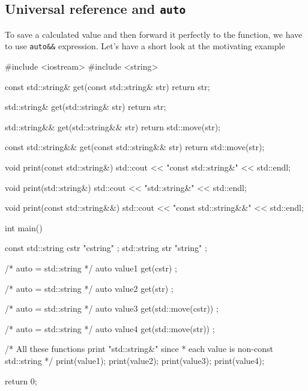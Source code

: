\documentclass[../main]{subfiles}
\begin{document}
\subsection{Universal reference and \texttt{auto}}
    To save a calculated value and then forward it perfectly to the function, we have to use \texttt{auto\&\&} expression. Let's have a short look at the motivating example
\begin{Code}
    #include <iostream>
    #include <string>
    
    const std::string& get(const std::string& str)
    {
        return str;
    }
    
    std::string& get(std::string& str)
    {
        return str;
    }
    
    std::string&& get(std::string&& str)
    {
        return std::move(str);
    }
    
    const std::string&& get(const std::string&& str)
    {
        return std::move(str);
    }
    
    void print(const std::string&)
    {
        std::cout << "const std::string&" << std::endl;
    }
    
    void print(std::string&)
    {
        std::cout << "std::string&" << std::endl;
    }
    
    void print(const std::string&&)
    {
        std::cout << "const std::string&&" << std::endl;
    }
    
    int main()
    {
        const std::string cstr { "cstring" };
        std::string str { "string" };

        /* auto = std::string */
        auto value1 { get(cstr) };

        /* auto = std::string */
        auto value2 { get(str) };
        
        /* auto = std::string */
        auto value3 { get(std::move(cstr)) };

        
        /* auto = std::string */
        auto value4 { get(std::move(str)) };
        
        /* All these functions print "std::string&" since
         * each value is non-const std::string
         */
        print(value1);
        print(value2);
        print(value3);
        print(value4);
    
        return 0;
    }
\end{Code}
\end{document}
